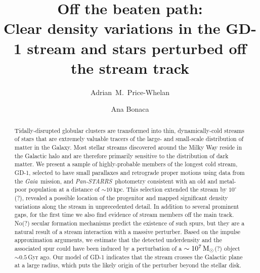 \documentclass[modern]{aastex62}
\newcommand{\gaia}{\textsl{Gaia}}
\newcommand{\pans}{\textsl{Pan-STARRS}}
\newcommand{\kpc}{\textrm{kpc}}
\begin{document}
\sloppy\sloppypar\raggedbottom\frenchspacing %

\title{Off the beaten path: \\
       Clear density variations in the GD-1 stream and stars perturbed off the
       stream track}

\author[0000-0003-0872-7098]{Adrian~M.~Price-Whelan}

\author[0000-0002-7846-9787]{Ana Bonaca}

\begin{abstract}\noindent %
Tidally-disrupted globular clusters are transformed into thin, dynamically-cold
streams of stars that are extremely valuable tracers of the large- and
small-scale distribution of matter in the Galaxy.
Most stellar streams discovered around the Milky Way reside in the Galactic halo
and are therefore primarily sensitive to the distribution of dark matter.
We present a sample of highly-probable members of the longest cold stream, GD-1,
selected to have small parallaxes and retrograde proper motions using data from
the \gaia\ mission, and \pans\ photometry consistent with an old and metal-poor
population at a distance of $\sim10~\kpc$.
This selection extended the stream by $10^\circ$(?), revealed a possible location of the progenitor and mapped significant density variations along the stream in unprecedented detail.
In addition to several prominent gaps, for the first time we also find evidence of stream members off the main track.
No(?) secular formation mechanisms predict the existence of such spurs, but they are a natural result of a stream interaction with a massive perturber.
Based on the impulse approximation arguments, we estimate that the detected underdensity and the associated spur could have been induced by a perturbation of a $\sim10^7\,\rm M_\odot$(?) object $\sim 0.5\,$Gyr ago.
Our model of GD-1 indicates that the stream crosses the Galactic plane at a large radius, which puts the likely origin of the perturber beyond the stellar disk.
\end{abstract}
\end{document}
